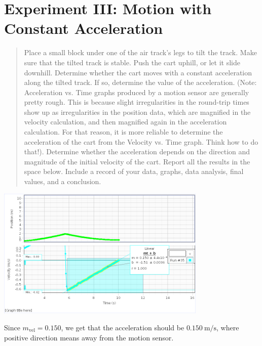 \documentclass[8pt]{extarticle}
\newcommand{\plain}[1]{\textrm{#1}}
\begin{document}
{\section*{Experiment III: Motion with Constant Acceleration}
\begin{quote}
	Place a small block under one of the air track’s legs to tilt the track. Make sure that the tilted track is stable. Push the cart uphill, or let it slide downhill. Determine whether the cart moves with a constant acceleration along the tilted track. If so, determine the value of the acceleration. (Note: Acceleration vs. Time graphs produced by a motion sensor are generally pretty rough. This is because slight irregularities in the round-trip times show up as irregularities in the position data, which are magnified in the velocity calculation, and then magnified again in the acceleration calculation. For that reason, it is more reliable to determine the acceleration of the cart from the Velocity vs. Time graph. Think how to do that!). Determine whether the acceleration depends on the direction and magnitude of the initial velocity of the cart. Report all the results in the space below. Include a record of your data, graphs, data analysis, final values, and a conclusion.
\end{quote}
\begin{center}
	\includegraphics[width=10cm]{Lab2Image3}
\end{center}
Since $m_{\plain{vel}} = 0.150$, we get that the acceleration should be $0.150~\plain{m/s}$, where positive direction means away from the motion sensor.
}
\end{document}
